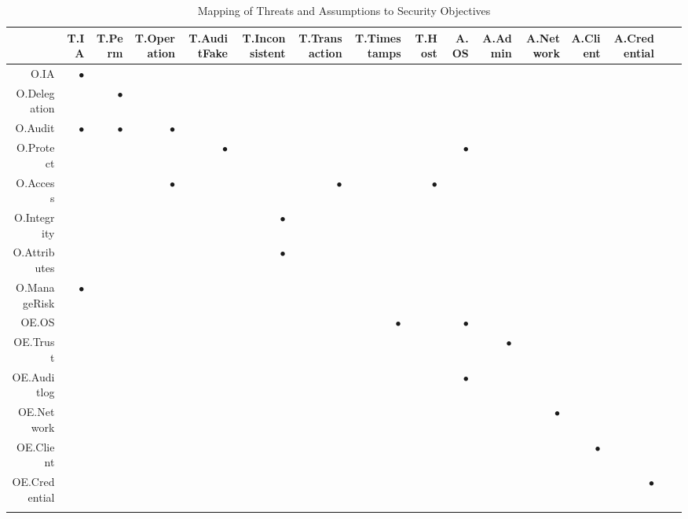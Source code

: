 \documentclass[12pt,english]{scrbook}
\newcommand{\oh}{$\bullet$}
\begin{document}
  \begin{longtable}{rRRRRRRRRRRRRRRR}
    \toprule
              & T.IA  & T.Perm &T.Operation&T.AuditFake& T.Inconsistent&T.Transaction&T.Timestamps & T.Host & A.OS & A.Admin & A.Network & A.Client & A.Credential  \\
    \midrule\endhead
O.IA         &  \oh  &       &            &            &               &             &             &        &      &       \\
O.Delegation &       &   \oh &            &            &               &             &             &        &      &        \\
O.Audit      & \oh   &   \oh &     \oh    &            &               &             &             &        &      &        \\
O.Protect    &       &       &            &    \oh     &               &             &             &        & \oh  &        \\
O.Access     &       &       &      \oh   &            &               &    \oh      &             &   \oh  &      &        \\
O.Integrity  &       &       &            &            &  \oh          &             &             &        &      &        \\
O.Attributes &       &       &            &            &  \oh          &             &             &        &      &        \\
O.ManageRisk &   \oh &       &            &            &               &             &             &        &      &        \\
\midrule
OE.OS        &       &       &            &            &               &             &    \oh      &        &  \oh &         &         &            &          \\
OE.Trust     &       &       &            &            &               &             &             &        &      &  \oh    &         &            &            \\
OE.Auditlog  &       &       &            &            &               &             &             &        & \oh  &         &         &            &                   \\  
OE.Network   &       &       &            &            &               &             &             &        &      &         &  \oh    &            &                   \\   
OE.Client    &       &       &            &            &               &             &             &        &      &         &         &    \oh     &                   \\
OE.Credential&       &       &            &            &               &             &             &        &      &         &         &            &    \oh    \\ 
\bottomrule
  \caption{Mapping of Threats and Assumptions to Security Objectives}
  \label{tab-SOR}
\end{longtable}
\end{document}
